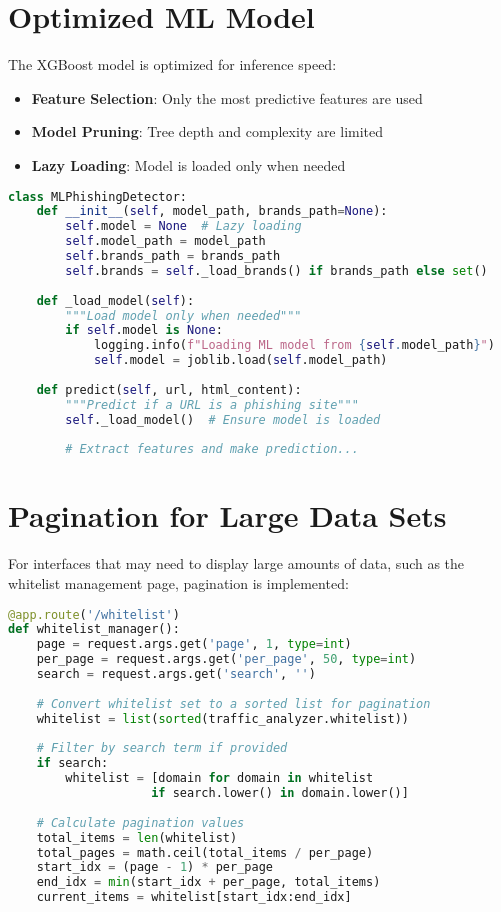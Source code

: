 \section{Optimized ML Model}

The XGBoost model is optimized for inference speed:

\begin{itemize}
    \item \textbf{Feature Selection}: Only the most predictive features are used
    \item \textbf{Model Pruning}: Tree depth and complexity are limited
    \item \textbf{Lazy Loading}: Model is loaded only when needed
\end{itemize}

\begin{lstlisting}[language=Python, caption=Optimized Model Loading]
class MLPhishingDetector:
    def __init__(self, model_path, brands_path=None):
        self.model = None  # Lazy loading
        self.model_path = model_path
        self.brands_path = brands_path
        self.brands = self._load_brands() if brands_path else set()
        
    def _load_model(self):
        """Load model only when needed"""
        if self.model is None:
            logging.info(f"Loading ML model from {self.model_path}")
            self.model = joblib.load(self.model_path)
            
    def predict(self, url, html_content):
        """Predict if a URL is a phishing site"""
        self._load_model()  # Ensure model is loaded
        
        # Extract features and make prediction...
\end{lstlisting}

\section{Pagination for Large Data Sets}

For interfaces that may need to display large amounts of data, such as the whitelist management page, pagination is implemented:

\begin{lstlisting}[language=Python, caption=Pagination Implementation]
@app.route('/whitelist')
def whitelist_manager():
    page = request.args.get('page', 1, type=int)
    per_page = request.args.get('per_page', 50, type=int)
    search = request.args.get('search', '')
    
    # Convert whitelist set to a sorted list for pagination
    whitelist = list(sorted(traffic_analyzer.whitelist))
    
    # Filter by search term if provided
    if search:
        whitelist = [domain for domain in whitelist 
                    if search.lower() in domain.lower()]
    
    # Calculate pagination values
    total_items = len(whitelist)
    total_pages = math.ceil(total_items / per_page)
    start_idx = (page - 1) * per_page
    end_idx = min(start_idx + per_page, total_items)
    current_items = whitelist[start_idx:end_idx]
\end{lstlisting}


